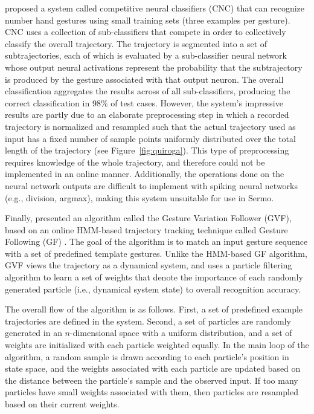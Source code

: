 \citet{quiroga2013}
proposed a system called competitive neural classifiers (CNC)
that can recognize number hand gestures
using small training sets (three examples per gesture).
CNC uses a collection of sub-classifiers
that compete in order to collectively
classify the overall trajectory.
The trajectory is segmented
into a set of subtrajectories,
each of which is evaluated by
a sub-classifier neural network
whose output neural activations
represent the probability that
the subtrajectory is produced by
the gesture associated with that output neuron.
The overall classification aggregates the results
across of all sub-classifiers,
producing the correct classification
in 98\% of test cases.
However, the system's impressive results
are partly due to an elaborate preprocessing step
in which a recorded trajectory
is normalized and resampled
such that the actual trajectory used as input
has a fixed number of sample points
uniformly distributed over
the total length of the trajectory
(see Figure~\ref{fig:quiroga}).
This type of preprocessing
requires knowledge of the whole trajectory,
and therefore could not be implemented
in an online manner.
Additionally, the operations done
on the neural network outputs
are difficult to implement
with spiking neural networks
(e.g., division, argmax),
making this system unsuitable
for use in Sermo.


Finally, \citet{caramiaux2014}
presented an algorithm called the
Gesture Variation Follower (GVF),
based on an online HMM-based
trajectory tracking technique
called Gesture Following (GF)
\citep{bevilacqua2010,bevilacqua2011}.
The goal of the algorithm is to match
an input gesture sequence
with a set of predefined template gestures.
Unlike the HMM-based GF algorithm,
GVF views the trajectory as a dynamical system,
and uses a particle filtering algorithm
to learn a set of weights
that denote the importance of
each randomly generated particle
(i.e., dynamical system state)
to overall recognition accuracy.

The overall flow of the algorithm
is as follows.
First, a set of predefined example trajectories
are defined in the system.
Second, a set of particles
are randomly generated
in an $n$-dimensional space
with a uniform distribution,
and a set of weights are initialized
with each particle weighted equally.
In the main loop of the algorithm,
a random sample is drawn
according to each particle's position
in state space,
and the weights associated with each particle
are updated based on the distance
between the particle's sample
and the observed input.
If too many particles have small weights
associated with them,
then particles are resampled
based on their current weights.

